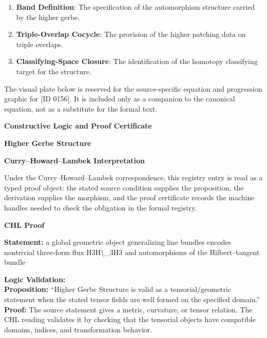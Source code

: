 \begin{enumerate}[leftmargin=1.6em,itemsep=6pt,topsep=4pt]
\item \textbf{Band Definition}: The specification of the automorphism structure carried by the higher gerbe.
\item \textbf{Triple-Overlap Cocycle}: The provision of the higher patching data on triple overlaps.
\item \textbf{Classifying-Space Closure}: The identification of the homotopy classifying target for the structure.
\end{enumerate}

\begingroup\footnotesize\sloppy
The visual plate below is reserved for the source-specific equation and progression graphic for [ID 0156]. It is included only as a companion to the canonical equation, not as a substitute for the formal text.
\par\endgroup
\ifTZPDarkEdition
{}
\fi

\clearpage
\begingroup\tzpsupportsetup
\noindent\textbf{\fontsize{10.8pt}{12.8pt}\selectfont [ID 0156] Constructive Logic and Proof Certificate}\par
\noindent\textbf{\fontsize{10pt}{12pt}\selectfont Higher Gerbe Structure}\par
\vspace{0.45em}
\begingroup
\footnotesize
\setlength{\parskip}{0.22em}
\setlength{\parindent}{0pt}
\noindent\textbf{Curry--Howard--Lambek Interpretation}\par
Under the Curry--Howard--Lambek correspondence, this registry entry is read as a typed proof
object: the stated source condition supplies the proposition, the derivation supplies the
morphism, and the proof certificate records the machine handles needed to check the obligation
in the formal registry.

\vspace{0.45em}
\noindent\textbf{CHL Proof}\par
\textbf{Statement:} a global geometric object generalizing line bundles encodes nontrivial three-form flux
H3H\textbackslash{}\_3H3 and automorphisms of the Hilbert--tangent bundle

\textbf{Logic Validation:}\\
\textbf{Proposition:} ``Higher Gerbe Structure is valid as a tensorial/geometric statement when the stated
tensor fields are well formed on the specified domain.''\\
\textbf{Proof:} The source statement gives a metric, curvature, or tensor relation. The CHL reading
validates it by checking that the tensorial objects have compatible domains, indices,
and transformation behavior.

